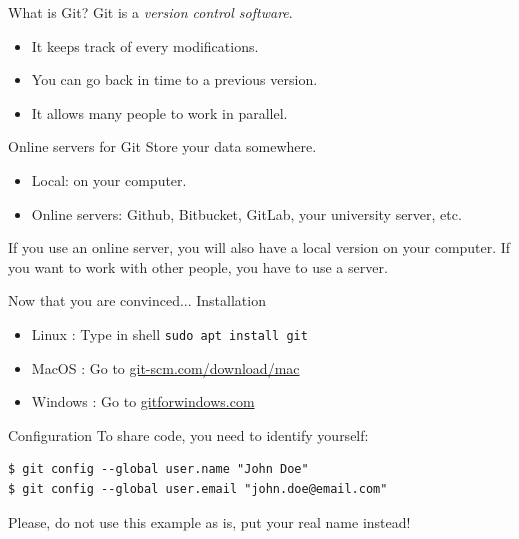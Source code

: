 \documentclass{beamer}
\begin{document}
	\begin{frame}{What is Git?}
		Git is a \textit{version control software}. \newline
		
		\begin{itemize}
			\item It keeps track of every modifications.
			\item You can go back in time to a previous version.
			\item It allows many people to work in parallel.
		\end{itemize}	
	\end{frame}

	\begin{frame}{Online servers for Git}
		Store your data somewhere. \newline 
			\begin{itemize}
				\item Local: on your computer.
				\item Online servers: Github, Bitbucket, GitLab, your university server, etc. \newline
			\end{itemize}
		If you use an online server, you will also have a local version on your computer. If you want to work with other people, you have to use a server. 
	\end{frame}

	\begin{frame}{Now that you are convinced... Installation}
		\begin{itemize}
			\item Linux : Type in shell \texttt{sudo apt install git}
			\item MacOS : Go to \url{git-scm.com/download/mac}
			\item Windows : Go to \url{gitforwindows.com}
		\end{itemize}
	\end{frame}

	\begin{frame}[fragile]{Configuration}
	To share code, you need to identify yourself:
	\begin{verbatim}
$ git config --global user.name "John Doe"
$ git config --global user.email "john.doe@email.com"
	\end{verbatim}
	Please, do not use this example as is, put your real name instead!
	\end{frame}
\end{document}
